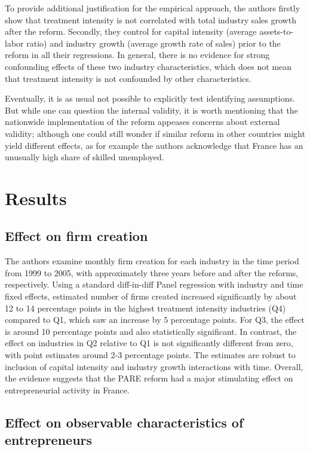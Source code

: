 To provide additional justification for the empirical approach, the authors firstly show that treatment intensity is not correlated with total industry sales growth after the reform. Secondly, they control for capital intensity (average assets-to-labor ratio) and industry growth (average growth rate of sales) prior to the reform in all their regressions. In general, there is no evidence for strong confounding effects of these two industry characteristics, which does not mean that treatment intensity is not confounded by other characteristics. \newline

\noindent Eventually, it is as usual not possible to explicitly test identifying assumptions. But while one can question the internal validity, it is worth mentioning that the nationwide implementation of the reform appeases concerns about external validity; although one could still wonder if similar reform in other countries might yield different effects, as for example the authors acknowledge that France has an unusually high share of skilled unemployed.


\section{Results}

\subsection{Effect on firm creation}

The authors examine monthly firm creation for each industry in the time period from 1999 to 2005, with approximately three years before and after the reforms, respectively. Using a standard diff-in-diff Panel regression with industry and time fixed effects, estimated number of firms created increased significantly by about 12 to 14 percentage points in the highest treatment intensity industries (Q4) compared to Q1, which saw an increase by 5 percentage points. For Q3, the effect is around 10 percentage points and also statistically significant. In contrast, the effect on industries in Q2 relative to Q1 is not significantly different from zero, with point estimates around 2-3 percentage points. The estimates are robust to inclusion of capital intensity and industry growth interactions with time. Overall, the evidence suggests that the PARE reform had a major stimulating effect on entrepreneurial activity in France.


\subsection{Effect on observable characteristics of entrepreneurs}

